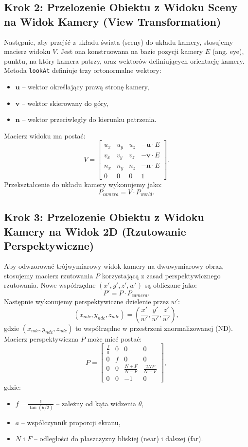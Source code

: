 \documentclass[a4paper,12pt]{article}
\begin{document}
\subsection{Krok 2: Przelozenie Obiektu z Widoku Sceny na Widok Kamery (View Transformation)}
Następnie, aby przejść z układu świata (sceny) do układu kamery, stosujemy macierz widoku \( V \). Jest ona konstruowana na bazie pozycji kamery \( E \) (ang. eye), punktu, na który kamera patrzy, oraz wektorów definiujących orientację kamery.
Metoda \texttt{lookAt} definiuje trzy ortonormalne wektory:
\begin{itemize}
    \item \( \mathbf{u} \) – wektor określający prawą stronę kamery,
    \item \( \mathbf{v} \) – wektor skierowany do góry,
    \item \( \mathbf{n} \) – wektor przeciwległy do kierunku patrzenia.
\end{itemize}
Macierz widoku ma postać:
\[
V = \begin{bmatrix}
u_x & u_y & u_z & -\mathbf{u} \cdot E \\
v_x & v_y & v_z & -\mathbf{v} \cdot E \\
n_x & n_y & n_z & -\mathbf{n} \cdot E \\
0   & 0   & 0   & 1 
\end{bmatrix}.
\]
Przekształcenie do układu kamery wykonujemy jako:
\[
P_{camera} = V \cdot P_{world}.
\]

\subsection{Krok 3: Przelozenie Obiektu z Widoku Kamery na Widok 2D (Rzutowanie Perspektywiczne)}
Aby odwzorować trójwymiarowy widok kamery na dwuwymiarowy obraz, stosujemy macierz rzutowania \( P \) korzystającą z zasad perspektywicznego rzutowania.
Nowe współrzędne \((x', y', z', w')\) są obliczane jako:
\[
P' = P \cdot P_{camera}.
\]
Następnie wykonujemy perspektywiczne dzielenie przez \( w' \):
\[
(x_{ndc}, y_{ndc}, z_{ndc}) = \left(\frac{x'}{w'}, \frac{y'}{w'}, \frac{z'}{w'}\right),
\]
gdzie \( (x_{ndc}, y_{ndc}, z_{ndc}) \) to współrzędne w przestrzeni znormalizowanej (ND). Macierz perspektywiczna \( P \) może mieć postać:
\[
P = \begin{bmatrix}
\frac{f}{a} & 0       & 0                & 0 \\
0       & f       & 0                & 0 \\
0       & 0       & \frac{N+F}{N-F}  & \frac{2NF}{N-F} \\
0       & 0       & -1               & 0 
\end{bmatrix},
\]
gdzie:
\begin{itemize}
    \item \( f = \frac{1}{\tan(\theta/2)} \) – zależny od kąta widzenia \( \theta \),
    \item \( a \) – współczynnik proporcji ekranu,
    \item \( N \) i \( F \) – odległości do płaszczyzny bliskiej (near) i dalszej (far).
\end{itemize}
\end{document}
